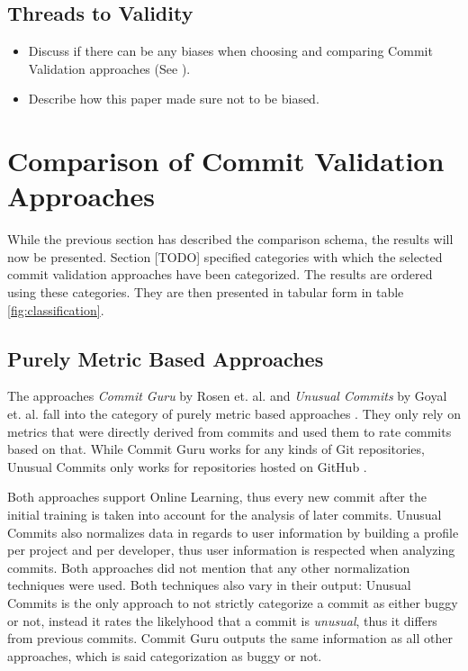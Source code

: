 \subsection{Threads to Validity}
\begin{itemize}
	\item Discuss if there can be any biases when choosing and comparing Commit Validation approaches (See \cite{Kitchenham2004}).
	\item Describe how this paper made sure not to be biased.
\end{itemize}


\section{Comparison of Commit Validation Approaches}
\label{sec:comparison}

While the previous section has described the comparison schema, the results will now be presented. Section [TODO] specified categories with which the selected commit validation approaches have been categorized. The results are ordered using these categories. They are then presented in tabular form in table \ref{fig:classification}.

\subsection{Purely Metric Based Approaches}


The approaches \textit{Commit Guru} by Rosen et. al. and \textit{Unusual Commits} by Goyal et. al. fall into the category of purely metric based approaches \cite{Rosen2015,Goyal2017}. They only rely on metrics that were directly derived from commits and used them to rate commits based on that. While Commit Guru works for any kinds of Git repositories, Unusual Commits only works for repositories hosted on GitHub \cite{Rosen2015,Goyal2017}.

Both approaches support Online Learning, thus every new commit after the initial training is taken into account for the analysis of later commits.
Unusual Commits also normalizes data in regards to user information by building a profile per project and per developer, thus user information is respected when analyzing commits. Both approaches did not mention that any other normalization techniques were used.
Both techniques also vary in their output: Unusual Commits is the only approach to not strictly categorize a commit as either buggy or not, instead it rates the likelyhood that a commit is \textit{unusual}, thus it differs from previous commits. Commit Guru outputs the same information as all other approaches, which is said categorization as buggy or not. \cite{Rosen2015,Goyal2017}

